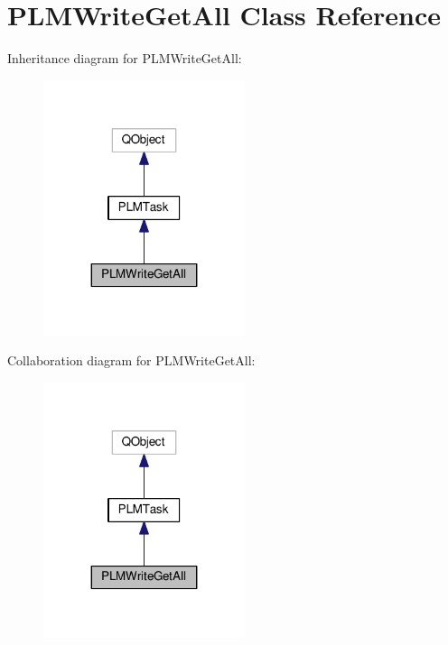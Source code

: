 \hypertarget{class_p_l_m_write_get_all}{}\section{P\+L\+M\+Write\+Get\+All Class Reference}
\label{class_p_l_m_write_get_all}


Inheritance diagram for P\+L\+M\+Write\+Get\+All\+:\nopagebreak
\begin{figure}[H]
\begin{center}
\leavevmode
\includegraphics[width=167pt]{class_p_l_m_write_get_all__inherit__graph}
\end{center}
\end{figure}


Collaboration diagram for P\+L\+M\+Write\+Get\+All\+:\nopagebreak
\begin{figure}[H]
\begin{center}
\leavevmode
\includegraphics[width=167pt]{class_p_l_m_write_get_all__coll__graph}
\end{center}
\end{figure}
